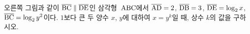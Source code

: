 \noindent\begin{minipage}[t]{0.58\linewidth}\vspace{0pt}\raggedright 오른쪽 그림과 같이 $\overline{\mathrm{BC}}\parallel\overline{\mathrm{DE}}$인 삼각형~$\mathrm{ABC}$에서 $\overline{\mathrm{AD}}=2$, $\overline{\mathrm{DB}}=3$, $\overline{\mathrm{DE}}=\log_2 x$, $\overline{\mathrm{BC}}=\log_2 y^2$이다. $1$보다 큰 두 양수 $x$, $y$에 대하여 $x=y^k$일 때, 상수 $k$의 값을 구하시오.\end{minipage}\hfill\begin{minipage}[t]{0.4\linewidth}\vspace{0pt}\centering \resizebox{\ifdim\width>\linewidth\linewidth\else\width\fi}{!}{}\end{minipage}\par
